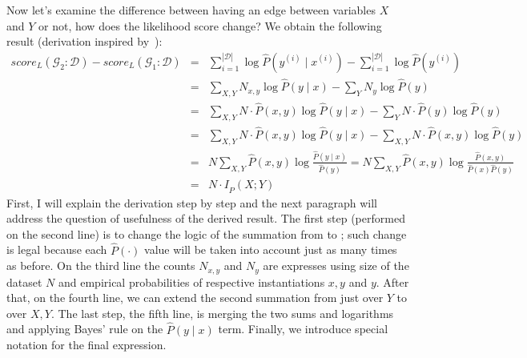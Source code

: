 \documentclass[english,cover]{fitthesis} %
\begin{document}
Now let's examine the difference between having an edge between variables $X$ and $Y$ or not, how does the likelihood score change? We obtain the following result (derivation inspired by~\cite[p.~791]{pgm}):
\begin{eqnarray*}
   score_L(\mathcal{G}_2 : \mathcal{D}) - score_L(\mathcal{G}_1 : \mathcal{D}) 
     & \!\!\! = & \!\!\! \sum_{i=1}^{|\mathcal{D}|} \log \hat P(y^{(i)} \mid x^{(i)}) - \sum_{i=1}^{|\mathcal{D}|} \log \hat P(y^{(i)}) \\
     & \!\!\! = & \!\!\! \sum_{X,Y} N_{x,y} \log \hat P(y \mid x) - \sum_{Y} N_y \log \hat P(y) \\
     & \!\!\! = & \!\!\! \sum_{X,Y} N \cdot \hat P(x,y) \log \hat P(y \mid x) - \sum_{Y} N \cdot \hat P(y) \log \hat P(y) \\
     & \!\!\! = & \!\!\! \sum_{X,Y} N \cdot \hat P(x,y) \log \hat P(y \mid x) - \sum_{X, Y} N \cdot \hat P(x, y) \log \hat P(y) \\
     & \!\!\! = & \!\!\! N \sum_{X,Y} \hat P(x,y) \log \frac{\hat P(y \mid x)}{\hat P(y)}
       = N \sum_{X,Y} \hat P(x,y) \log \frac{\hat P(x, y)}{\hat P(x) \hat P(y)} \\
     & \!\!\! = & \!\!\! N \cdot I_{\hat P}(X; Y)
\end{eqnarray*}
First, I will explain the derivation step by step and the next paragraph will address the question of usefulness of the derived result. The first step (performed on the second line) is to change the logic of the summation from  to ; such change is legal because each $\hat P(\cdot)$ value will be taken into account just as many times as before.
On the third line the counts $N_{x,y}$ and $N_y$ are expresses using size of the dataset $N$ and empirical probabilities of respective instantiations $x,y$ and $y$.
After that, on the fourth line, we can extend the second summation from just over $Y$ to over $X,Y$.
The last step, the fifth line, is merging the two sums and logarithms and applying Bayes' rule on the $\hat P(y \mid x)$ term. Finally, we introduce special notation for the final expression.
\end{document}
